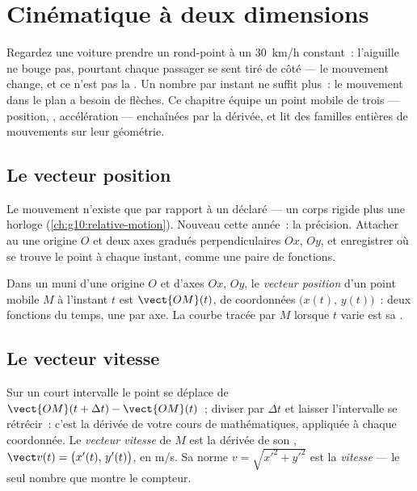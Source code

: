 \chapter{Cinématique à deux dimensions}\label{ch:g12:kinematics-2d}

Regardez une voiture prendre un rond-point à un \qty{30}{km/h} constant~:
l'aiguille ne bouge pas, pourtant chaque passager se sent tiré de côté
--- le mouvement change, et ce n'est pas la . Un nombre
par instant ne suffit plus~: le mouvement dans le plan a besoin de
flèches. Ce chapitre équipe un point mobile de trois --- position,
, accélération --- enchaînées par la dérivée, et lit des familles
entières de mouvements sur leur géométrie.

\section{Le vecteur position}

Le mouvement n'existe que par rapport à un  déclaré
--- un corps rigide plus une horloge (\cref{ch:g10:relative-motion}).
Nouveau cette année~: la précision. Attacher au  une origine
$O$ et deux axes gradués perpendiculaires $Ox$, $Oy$, et enregistrer où
se trouve le point à chaque instant, comme une paire de fonctions.

\begin{definition}\label{def:g12:kinematics-2d:position}
Dans un  muni d'une origine $O$ et d'axes $Ox$, $Oy$, le
\emph{vecteur position} d'un point mobile $M$
à l'instant $t$ est $\vect{OM}(t)$, de coordonnées
$\bigl(x(t),\, y(t)\bigr)$~: deux fonctions du temps, une par axe. La
courbe tracée par $M$ lorsque $t$ varie est sa
.
\end{definition}

\section{Le vecteur vitesse}

\begin{definition}\label{def:g12:kinematics-2d:velocity}
Sur un court intervalle le point se déplace de
$\vect{OM}(t+\Delta t) - \vect{OM}(t)$~; diviser par $\Delta t$ et
laisser l'intervalle se rétrécir~: c'est la dérivée de votre cours de
mathématiques, appliquée à chaque coordonnée. Le \emph{vecteur
vitesse} de $M$ est la dérivée de son
, $\vect v(t) = \bigl(x'(t),\, y'(t)\bigr)$,
en \unit{m/s}. Sa norme $v = \sqrt{x'^2 + y'^2}$ est la
\emph{vitesse} --- le seul nombre que montre
le compteur.
\end{definition}

